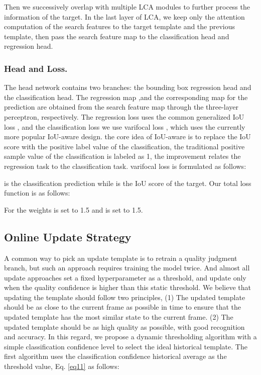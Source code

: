 \documentclass[letterpaper]{article} \usepackage{aaai23}  \usepackage{times}  \usepackage{helvet}  \usepackage{courier}  \usepackage[hyphens]{url}  \usepackage{graphicx} \urlstyle{rm} \def\UrlFont{\rm}  \usepackage{natbib}  \usepackage{caption} \frenchspacing  \setlength{\pdfpagewidth}{8.5in}  \setlength{\pdfpageheight}{11in}  \usepackage{algorithm}
\begin{document}
Then we successively overlap with multiple LCA modules to further process the information of the target. In the last layer of LCA, we keep only the attention computation of the search features to the target template and the previous template, then pass the search feature map to the classification head and regression head.

\subsubsection{Head and Loss.}
The head network contains two branches: the bounding box regression head and the classification head. The regression map ,and the corresponding map  for the prediction are obtained from the search feature map through the three-layer perceptron, respectively. The regression loss uses the common generalized IoU loss \cite{giou}, and the classification loss we use varifocal loss \cite{varifocal}, which uses the currently more popular IoU-aware design. the core idea of IoU-aware is to replace the IoU score with the positive label value of the classification, the traditional positive sample value of the classification is labeled as 1, the improvement relates the regression task to the classification task. varifocal loss is formulated as follows:
 
 is the classification prediction while  is the IoU score of the target. Our total loss function is as follows:
 
For the weights  is set to 1.5 and  is set to 1.5.
\subsection{Online Update Strategy}

A common way to pick an update template is to retrain a quality judgment branch, but such an approach requires training the model twice. And almost all update approaches set a fixed hyperparameter as a threshold, and update only when the quality confidence is higher than this static threshold. We believe that updating the template should follow two principles, (1) The updated template should be as close to the current frame as possible in time to ensure that the updated template has the most similar state to the current frame. (2) The updated template should be as high quality as possible, with good recognition and accuracy. In this regard, we propose a dynamic thresholding algorithm with a simple classification confidence level to select the ideal historical template. The first algorithm uses the classification confidence historical average as the threshold value, Eq. \ref{eq11} as follows:
 
\end{document}
